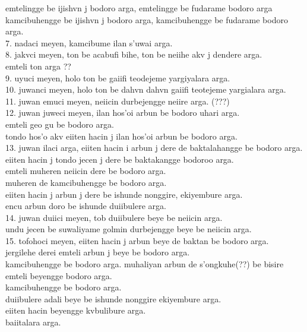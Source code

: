 \documentclass{report}
\begin{document}
emtelingge be ijishvn j bodoro arga, emtelingge be fudarame bodoro arga \\
kamcibuhengge be ijishvn j bodoro arga, kamcibuhengge be fudarame bodoro arga.\\
7. nadaci meyen, kamcibume ilan s'uwai arga.\\
8. jakvci meyen, ton be acabufi bihe, ton be neiihe akv j dendere arga.\\
emteli ton arga ??\\
9. uyuci meyen, holo ton be gaiifi teodejeme yargiyalara arga.\\
10. juwanci meyen, holo ton be dahvn dahvn gaiifi teotejeme yargialara arga.\\
11. juwan emuci meyen, neiicin durbejengge neiire arga. (???)\\
 12. juwan juweci meyen, ilan hos'oi arbun be bodoro uhari arga.\\
 emteli geo gu be bodoro arga.\\
 tondo hos'o akv eiiten hacin j ilan hos'oi arbun be bodoro arga.\\ 
 13. juwan ilaci arga, eiiten hacin i arbun j dere de baktalahangge be bodoro arga.\\
 eiiten hacin j tondo jecen j dere be baktakangge bodoroo arga.\\
 emteli muheren neiicin dere be bodoro arga.\\
 muheren de kamcibuhengge be bodoro arga.\\
 eiiten hacin j arbun j dere be ishunde nonggire, ekiyembure arga.\\
 encu arbun doro be ishunde duiibulere arga.\\
 14. juwan duiici meyen, tob duiibulere beye be neiicin arga.\\
 undu jecen be suwaliyame golmin durbejengge beye be neiicin arga.\\
 15. tofohoci meyen, eiiten hacin j arbun beye de baktan be bodoro arga.\\
 jergilehe derei emteli arbun j beye be bodoro arga.\\
 kamcibuhengge be bodoro arga. muhaliyan arbun de s'ongkuhe(??) be bisire emteli beyengge bodoro arga.\\
 kamcibuhengge be bodoro arga.\\
 duiibulere adali beye be ishunde nonggire ekiyembure arga.\\
 eiiten hacin beyengge kvbulibure arga.\\
 baiitalara arga.


\end{document}
